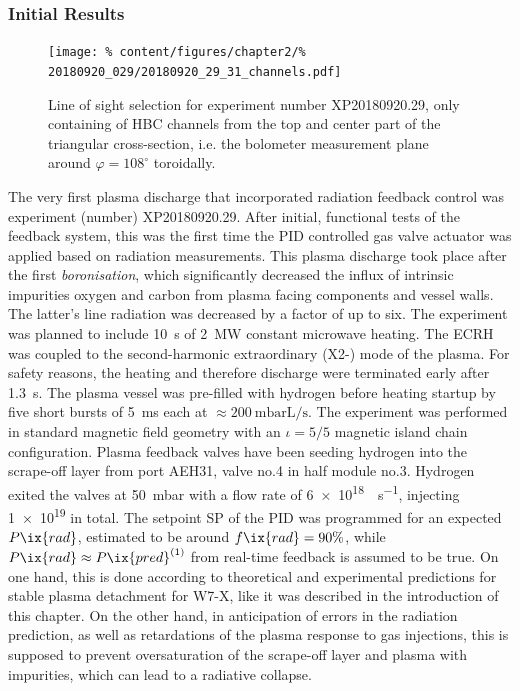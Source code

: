         \subsubsection*{Initial Results}%
%
            \begin{figure}[t]%
                \centering%
                \captionsetup{width=.45\textwidth}%
                \begin{minipage}[c]{0.45\textwidth}%
                    \caption{Line of sight selection for experiment number XP20180920.29, only containing of HBC channels from the top and center part of the triangular cross-section, i.e. the bolometer measurement plane around $\varphi=108^{\circ}$ toroidally.}\label{fig:20180920.29_channels}%
                \end{minipage}%
                \hfill%
                \begin{minipage}[c]{0.5\textwidth}%
                    \texttt{[image: \%
                        content/figures/chapter2/\%
                        20180920\_029/20180920\_29\_31\_channels.pdf]}%
                \end{minipage}%
            \end{figure}%
%
            The very first plasma discharge that incorporated radiation feedback control was experiment (number) XP20180920.29. After initial, functional tests of the feedback system, this was the first time the PID controlled gas valve actuator was applied based on radiation measurements. This plasma discharge took place after the first \textit{boronisation}, which significantly decreased the influx of intrinsic impurities oxygen and carbon from plasma facing components and vessel walls. The latter's line radiation was decreased by a factor of up to six\cite{Wang2020}. The experiment was planned to include \SI{10}{\second} of \SI{2}{\mega\watt} constant microwave heating. The ECRH was coupled to the second-harmonic extraordinary (X2-) mode of the plasma. For safety reasons, the heating and therefore discharge were terminated early after \SI{1.3}{\second}. The plasma vessel was pre-filled with hydrogen before heating startup by five short bursts of \SI{5}{\milli\second} each at $\approx\SI{200}{\milli\bar\liter\per\second}$. The experiment was performed in standard magnetic field geometry with an $\iota=5/5$ magnetic island chain configuration. Plasma feedback valves have been seeding hydrogen into the scrape-off layer from port AEH31, valve no.4 in half module no.3. Hydrogen exited the valves at \SI{50}{\milli\bar} with a flow rate of \SI{6e18}{\atom\per\second}, injecting \SI{1e19}{\atom} in total. The setpoint SP of the PID was programmed for an expected $P\ix{rad}$, estimated to be around $f\ix{rad}=90\%$, while $P\ix{rad}\approx P\ix{pred}^{\left(1\right)}$ from real-time feedback is assumed to be true. On one hand, this is done according to theoretical and experimental predictions for stable plasma detachment for W7-X, like it was described in the introduction of this chapter. On the other hand, in anticipation of errors in the radiation prediction, as well as retardations of the plasma response to gas injections, this is supposed to prevent oversaturation of the scrape-off layer and plasma with impurities, which can lead to a radiative collapse.\\%
